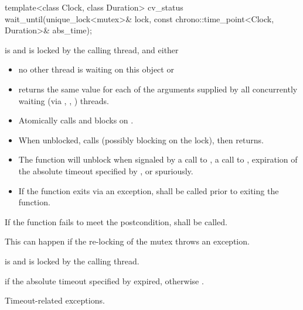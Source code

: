%
\begin{itemdecl}
template<class Clock, class Duration>
  cv_status wait_until(unique_lock<mutex>& lock,
                       const chrono::time_point<Clock, Duration>& abs_time);
\end{itemdecl}
\begin{itemdescr}
 \pnum \requires {} is  and 
        is locked by the calling thread, and either
        \begin{itemize}
         \item no other thread is waiting on this  object or
         \item {} returns the same value for each of the 
                arguments supplied by all concurrently waiting (via ,
                , ) threads.
        \end{itemize}

 \pnum \effects
        \begin{itemize}
         \item Atomically calls  and blocks on .

         \item When unblocked, calls  (possibly blocking on the lock), then returns.

         \item The function will unblock when signaled by a call to , a call to ,
                expiration of the absolute timeout specified by ,
                or spuriously.

         \item If the function exits via an exception,  shall be called prior to exiting the function.
        \end{itemize}

 \pnum \remarks
        If the function fails to meet the postcondition, 
        shall be called.
        \begin{note} This can happen if the re-locking of the mutex throws an exception. \end{note}

 \pnum \postconditions {} is  and 
        is locked by the calling thread.

 \pnum \returns {} if
        the absolute timeout specified by  expired,
        otherwise .

 \pnum\throws Timeout-related exceptions.
\end{itemdescr}

